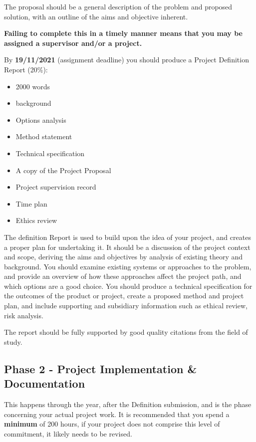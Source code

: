 The proposal should be a general description of the problem and proposed solution, with an outline of the aims and objective inherent. 

\medskip

\textbf{Failing to complete this in a timely manner means that you may be assigned a supervisor and/or a project.}

\medskip

By \textbf{19/11/2021} (assignment deadline) you should produce a Project Definition Report (20\%):

\begin{itemize}
    \item 2000 words
    \item background
    \item Options analysis
    \item Method statement
    \item Technical specification
    \item A copy of the Project Proposal
    \item Project supervision record
    \item Time plan
    \item Ethics review
\end{itemize}

The definition Report is used to build upon the idea of your project, and creates a proper plan for undertaking it. It should be a discussion of the project context and scope, deriving the aims and objectives by analysis of existing theory and background. You should examine existing systems or approaches to the problem, and provide an overview of how these approaches affect the project path, and which options are a good choice. You should produce a technical specification for the outcomes of the product or project, create a proposed method and project plan, and include supporting and subsidiary information such as ethical review, risk analysis. 

The report should be fully supported by good quality citations from the field of study.

\subsection{Phase 2 - Project Implementation \& Documentation}

This happens through the year, after the Definition submission, and is the phase concerning your actual project work. It is recommended that you spend a \textbf{minimum} of 200 hours, if your project does not comprise this level of commitment, it likely needs to be revised.

